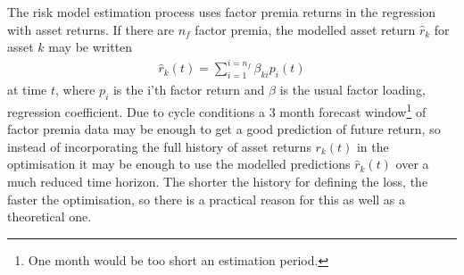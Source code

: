 \documentclass[12pt]{article}
\begin{document}
The risk model estimation process uses factor premia returns in the regression
with asset returns. If there are $n_f$ factor premia, the modelled asset return $\hat{r}_{k}$ for asset $k$ may be written
\begin{eqnarray}
    \hat{r}_{k}(t) = \sum_{i=1}^{i=n_f}\beta_{ki} p_{i}(t)
\end{eqnarray}
at time $t$, where $p_i$ is the i'th factor return and $\beta$ is the usual factor loading, regression coefficient.
Due to cycle conditions a 3 month forecast window\footnote{One month would be too short an estimation period.} of factor premia data may be enough
to get a good prediction of future return, so instead of incorporating the full history of
asset returns $r_k(t)$ in the optimisation it may be enough to use the modelled predictions
$\hat{r}_{k}(t)$ over a much reduced time horizon. The shorter the history for defining the
loss, the faster the optimisation, so there is a practical reason for this as well as
a theoretical one.
\end{document}
